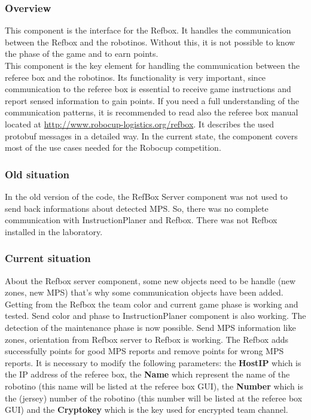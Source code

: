 
\subsubsection{Overview}

This component is the interface for the Refbox. It handles the communication between the Refbox and the robotinos. Without this, it is not possible to know the phase of the game and to earn points. \\

This component is the key element for handling the communication between the referee box and the robotinos. Its functionality is very important, since communication to the referee box is essential to receive game instructions and report sensed information to gain points. If you need a full understanding of the communication patterns, it is recommended to read also the referee box manual located at \url{ http://www.robocup-logistics.org/refbox}. It describes the used protobuf messages in a detailed way. In the current state, the component covers most of the use cases needed for the Robocup competition.
 

\subsubsection{Old situation}

In the old version of the code, the RefBox Server component was not used to send back informations about detected MPS. So, there was no complete communication with InstructionPlaner and Refbox. There was not Refbox installed in the laboratory. 


\subsubsection{Current situation}

About the Refbox server component, some new objects need to be handle (new zones, new MPS) that’s why some communication objects have been added. Getting from the Refbox the team color and current game phase is working and tested. Send color and phase to InstructionPlaner component is also working. The detection of the maintenance phase is now possible. Send MPS information like zones, orientation from Refbox server to Refbox is working. The Refbox adds successfully points for good MPS reports and remove points for wrong MPS reports. It is necessary to modify the following parameters: the \textbf{HostIP} which is the IP address of the referee box, the \textbf{Name} which represent the name of the robotino (this name will be listed at the referee box GUI), the \textbf{Number} which is the (jersey) number of the robotino (this number will be listed at the referee box GUI) and the \textbf{Cryptokey} which is the key used for encrypted team channel.\\

